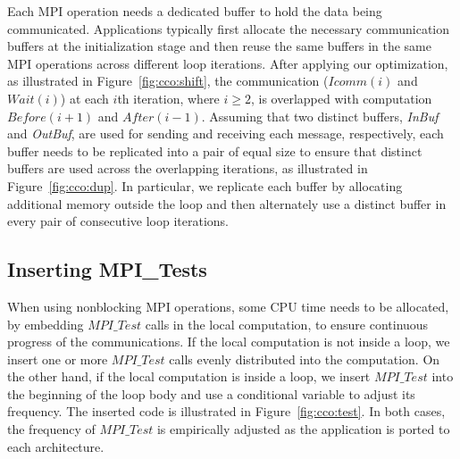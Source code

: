 Each MPI operation needs a dedicated buffer to hold the data being
communicated.  Applications typically first allocate the necessary
communication buffers at the initialization stage and then reuse the
same buffers in the same MPI operations across different loop
iterations.  After applying our optimization, as illustrated in
Figure~\ref{fig:cco:shift}, the communication ($Icomm(i)$ and
$Wait(i)$) at each $i$th iteration, where $i \geq 2$, is overlapped
with computation $Before(i+1)$ and $After(i-1)$.  Assuming that two
distinct buffers, {\em InBuf} and {\em OutBuf}, are used for sending
and receiving each message, respectively, each buffer needs to be
replicated into a pair of equal size to ensure that distinct buffers
are used across the overlapping iterations, as illustrated in
Figure~\ref{fig:cco:dup}.  In particular, we replicate each buffer by
allocating additional memory outside the loop and then alternately use
a distinct buffer in every pair of consecutive loop iterations.


\subsection{Inserting MPI\_Tests}

When using nonblocking MPI operations, some CPU time needs to be
allocated, by embedding $MPI\_Test$ calls in the local computation, to
ensure continuous progress of the communications.  If the local
computation is not inside a loop, we insert one or more $MPI\_Test$
calls evenly distributed into the computation.  On the other hand, if
the local computation is inside a loop, we insert $MPI\_Test$ into the
beginning of the loop body and use a conditional variable to adjust
its frequency.  The inserted code is illustrated in
Figure~\ref{fig:cco:test}.  In both cases, the frequency of
$MPI\_Test$ is empirically adjusted as the application is ported to
each architecture.


